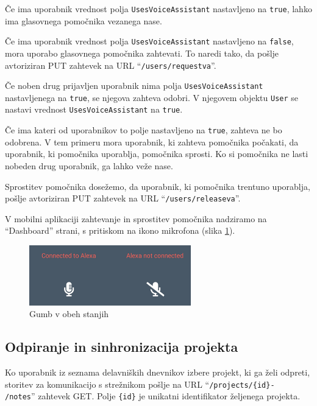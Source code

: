 \documentclass[a4paper, 12pt]{book}
\begin{document}
Če ima uporabnik vrednost polja \texttt{UsesVoiceAssistant} nastavljeno na \texttt{true}, lahko ima glasovnega pomočnika vezanega nase.

Če ima uporabnik vrednost polja \texttt{UsesVoiceAssistant} nastavljeno na \texttt{false}, mora uporabo glasovnega pomočnika zahtevati.
To naredi tako, da pošlje avtoriziran PUT zahtevek na URL \enquote{\texttt{/users/requestva}}.

Če noben drug prijavljen uporabnik nima polja \texttt{UsesVoiceAssistant} nastavljenega na \texttt{true}, se njegova zahteva odobri.
V njegovem objektu \texttt{User} se nastavi vrednost \texttt{UsesVoiceAssistant} na \texttt{true}.

Če ima kateri od uporabnikov to polje nastavljeno na \texttt{true}, zahteva ne bo odobrena.
V tem primeru mora uporabnik, ki zahteva pomočnika počakati, da uporabnik, ki pomočnika uporablja, pomočnika sprosti.
Ko si pomočnika ne lasti nobeden drug uporabnik, ga lahko veže nase.

Sprostitev pomočnika dosežemo, da uporabnik, ki pomočnika trentuno uporablja, pošlje avtoriziran PUT zahtevek na URL \enquote{\texttt{/users/releaseva}}.

V mobilni aplikaciji zahtevanje in sprostitev pomočnika nadziramo na \enquote{Dashboard} strani, s pritiskom na ikono mikrofona (slika \ref{app_alexa_yesno}).

\begin{figure}[H]
\begin{center}
\includegraphics[width=7cm]{app_alexa_yesno}
\end{center}
	\caption{Gumb v obeh stanjih}
\label{app_alexa_yesno}
\end{figure}

\subsection{Odpiranje in sinhronizacija projekta}

Ko uporabnik iz seznama delavniških dnevnikov izbere projekt, ki ga želi odpreti, storitev za komunikacijo s strežnikom pošlje na URL \enquote{\texttt{/projects/\{id\}-\\/notes}} zahtevek GET.
Polje \texttt{\{id\}} je unikatni identifikator željenega projekta.
\end{document}
